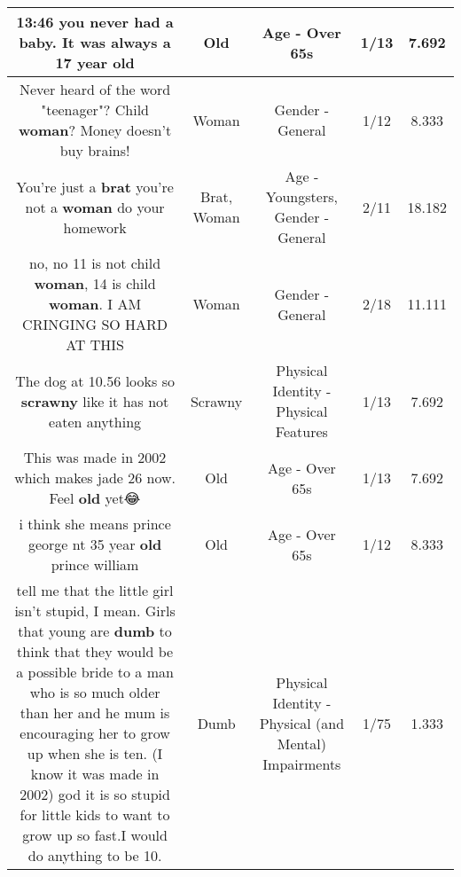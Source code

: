 \documentclass[11pt]{article}
\newlength\mylength
\begin{document}
\begin{center}
\begin{longtable}{|C{.65\mylength}|C{.30\mylength}|C{.12\mylength}|C{.12\mylength}|C{.12\mylength}|}
  \small 13:46 you never had a baby. It was always a 17 year old\normalsize   & Old & Age - Over 65s & 1/13 & 7.692 \\  \hline
  \small Never heard of the word "teenager"? Child \textbf{woman}? Money doesn't buy brains!\normalsize   & Woman & Gender - General & 1/12 & 8.333 \\  \hline
  \small You're just a \textbf{brat} you're not a \textbf{woman} do your homework\normalsize   & Brat, Woman & Age - Youngsters, Gender - General & 2/11 & 18.182 \\  \hline
  \small no, no 11 is not child \textbf{woman}, 14 is child \textbf{woman}. I AM CRINGING SO HARD AT THIS\normalsize   & Woman & Gender - General & 2/18 & 11.111 \\  \hline
  \small The dog at 10.56 looks so \textbf{scrawny} like it has not eaten anything\normalsize   & Scrawny & Physical Identity - Physical Features & 1/13 & 7.692 \\  \hline
  \small This was made in 2002 which makes jade 26 now. Feel \textbf{old} yet😂\normalsize   & Old & Age - Over 65s & 1/13 & 7.692 \\  \hline
  \small i think she means prince george nt 35 year \textbf{old} prince william\normalsize   & Old & Age - Over 65s & 1/12 & 8.333 \\  \hline
  \small tell me that the little girl isn't stupid, I mean. Girls that young are \textbf{dumb} to think that they would be a possible bride to a man who is so much older than her and he mum is encouraging her to grow up when she is ten. (I know it was made in 2002) god it is so stupid for little kids to want to grow up so fast.I would do anything to be 10.\normalsize   & Dumb & Physical Identity - Physical (and Mental) Impairments & 1/75 & 1.333 \\  \hline

\end{longtable}
\end{center}
\end{document}
